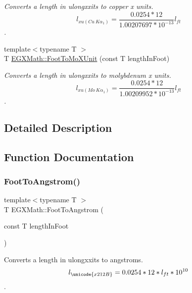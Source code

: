 \begin{DoxyCompactItemize}
\begin{DoxyCompactList}\small\item\em Converts a length in ulongxxits to copper x units. \[ l_{xu(Cu\ K\alpha_1)}=\frac{0.0254 * 12}{1.00207697*10^{-13}} l_{ft}\]. \end{DoxyCompactList}\item 
{\footnotesize template$<$typename T $>$ }\\T \mbox{\hyperlink{group___e_g_x_math-_conversions-_length_conversions-_imperial-_foot-_non-_s_i_ga06bc5f701660697593ed1aacd4abd3d6}{E\+G\+X\+Math\+::\+Foot\+To\+Mo\+X\+Unit}} (const T length\+In\+Foot)
\begin{DoxyCompactList}\small\item\em Converts a length in ulongxxits to molybdenum x units. \[ l_{xu(Mo\ K\alpha_1)}=\frac{0.0254 * 12}{1.00209952*10^{-13}} l_{ft}\]. \end{DoxyCompactList}\end{DoxyCompactItemize}


\subsection{Detailed Description}


\subsection{Function Documentation}
\mbox{\label{group___e_g_x_math-_conversions-_length_conversions-_imperial-_foot-_non-_s_i_ga39b1712b38ad7c61cb859376f07decda}} 
\subsubsection{\texorpdfstring{Foot\+To\+Angstrom()}{FootToAngstrom()}}
{\footnotesize\ttfamily template$<$typename T $>$ \\
T E\+G\+X\+Math\+::\+Foot\+To\+Angstrom (\begin{DoxyParamCaption}\item[{const T}]{length\+In\+Foot }\end{DoxyParamCaption})}



Converts a length in ulongxxits to angstroms. \[ l_{\unicode{x212B}}=0.0254 * 12 * l_{ft} * 10^{10} \]. 

